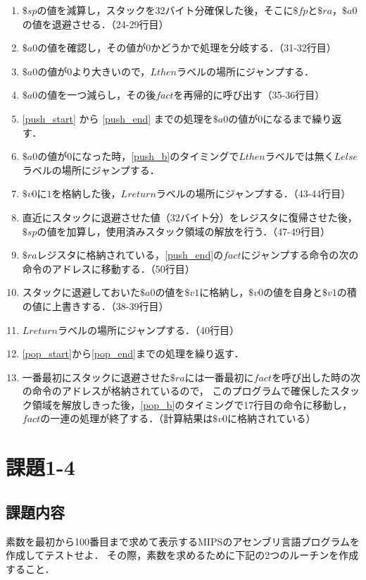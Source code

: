 \documentclass[a4j,11pt]{jarticle}
\begin{document}
\begin{enumerate}
      \item \label{push_start} $\$sp$の値を減算し，スタックを32バイト分確保した後，そこに$\$fp$と$\$ra$，$\$a0$の値を退避させる．（24-29行目）
      \item $\$a0$の値を確認し，その値が$0$かどうかで処理を分岐する．（31-32行目）
      \item \label{push_b}$\$a0$の値が$0$より大きいので，$Lthen$ラベルの場所にジャンプする．
      \item \label{push_end}$\$a0$の値を一つ減らし，その後$fact$を再帰的に呼び出す（35-36行目）
      \item \ref{push_start} から \ref{push_end} までの処理を$\$a0$の値が$0$になるまで繰り返す．
      \item $\$a0$の値が$0$になった時，\ref{push_b}のタイミングで$Lthen$ラベルでは無く$Lelse$ラベルの場所にジャンプする．
      \item $\$v0$に$1$を格納した後，$Lreturn$ラベルの場所にジャンプする．（43-44行目）
      \item \label{pop_start}直近にスタックに退避させた値（32バイト分）をレジスタに復帰させた後，$\$sp$の値を加算し，使用済みスタック領域の解放を行う．（47-49行目）
      \item \label{pop_b}$\$ra$レジスタに格納されている，\ref{push_end}の$fact$にジャンプする命令の次の命令のアドレスに移動する．（50行目）
      \item スタックに退避しておいた$\$a0$の値を$\$v1$に格納し，$\$v0$の値を自身と$\$v1$の積の値に上書きする．（38-39行目）
      \item \label{pop_end}$Lreturn$ラベルの場所にジャンプする．（40行目）
      \item \ref{pop_start}から\ref{pop_end}までの処理を繰り返す．
      \item 一番最初にスタックに退避させた$\$ra$には一番最初に$fact$を呼び出した時の次の命令のアドレスが格納されているので，
      このプログラムで確保したスタック領域を解放しきった後，\ref{pop_b}のタイミングで17行目の命令に移動し，$fact$の一連の処理が終了する．（計算結果は$\$v0$に格納されている）
\end{enumerate}

\section{課題1-4}
\subsection{課題内容}
素数を最初から100番目まで求めて表示するMIPSのアセンブリ言語プログラムを作成してテストせよ． 
その際，素数を求めるために下記の2つのルーチンを作成すること．
\end{document}
